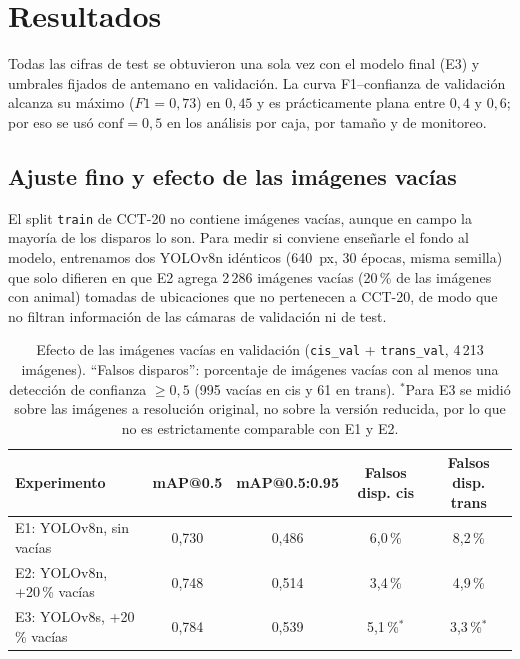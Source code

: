 
\section{Resultados}
\label{sec:resultados}

Todas las cifras de test se obtuvieron una sola vez con el modelo final (E3) y
umbrales fijados de antemano en validación. La curva F1--confianza de
validación alcanza su máximo ($F1=0{,}73$) en $0{,}45$ y es prácticamente plana
entre $0{,}4$ y $0{,}6$; por eso se usó $\text{conf}=0{,}5$ en los análisis por
caja, por tamaño y de monitoreo.

\subsection{Ajuste fino y efecto de las imágenes vacías}

El split \texttt{train} de CCT-20 no contiene imágenes vacías, aunque en campo
la mayoría de los disparos lo son. Para medir si conviene enseñarle el fondo al
modelo, entrenamos dos YOLOv8n idénticos (640~px, 30 épocas, misma semilla) que
solo difieren en que E2 agrega 2\,286 imágenes vacías (20\,\% de las imágenes
con animal) tomadas de ubicaciones que no pertenecen a CCT-20, de modo que no
filtran información de las cámaras de validación ni de test.

\begin{table}[h]
  \centering
  \caption{Efecto de las imágenes vacías en validación (\texttt{cis\_val} +
  \texttt{trans\_val}, 4\,213 imágenes). ``Falsos disparos'': porcentaje de
  imágenes vacías con al menos una detección de confianza $\geq 0{,}5$
  (995 vacías en cis y 61 en trans). $^{*}$Para E3 se midió sobre las imágenes a
  resolución original, no sobre la versión reducida, por lo que no es
  estrictamente comparable con E1 y E2.}
  \label{tab:vacias}
  \begin{tabular}{lcccc}
    \toprule
    Experimento & mAP@0.5 & mAP@0.5:0.95 & Falsos disp. cis & Falsos disp. trans \\
    \midrule
    E1: YOLOv8n, sin vacías   & 0,730 & 0,486 & 6,0\,\% & 8,2\,\% \\
    E2: YOLOv8n, +20\,\% vacías & 0,748 & 0,514 & 3,4\,\% & 4,9\,\% \\
    E3: YOLOv8s, +20\,\% vacías & 0,784 & 0,539 & 5,1\,\%$^{*}$ & 3,3\,\%$^{*}$ \\
    \bottomrule
  \end{tabular}
\end{table}

